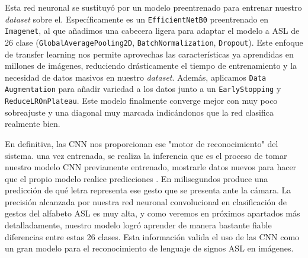 Esta red neuronal se sustituyó por un modelo preentrenado para entrenar nuestro \textit{dataset} sobre el. Específicamente es un \texttt{EfficientNetB0} preentrenado en \texttt{Imagenet}, al que añadimos una cabecera ligera para adaptar el modelo a ASL de 26 clase (\texttt{GlobalAveragePooling2D}, \texttt{BatchNormalization}, \texttt{Dropout}). Este enfoque de transfer learning nos permite aprovechas las características ya aprendidas en millones de imágenes, reduciendo drásticamente el tiempo de entrenamiento y la necesidad de datos masivos en nuestro \textit{dataset}.
Además, aplicamos \texttt{Data Augmentation} para añadir variedad a los datos junto a un \texttt{EarlyStopping} y \texttt{ReduceLROnPlateau}. Este modelo finalmente converge mejor con muy poco sobreajuste y una diagonal muy marcada indicándonos que la red clasifica realmente bien. 

En definitiva, las CNN nos proporcionan ese "motor de reconocimiento" del sistema. una vez entrenada, se realiza la inferencia que es el proceso de tomar nuestro modelo CNN previamente entrenado, mostrarle datos nuevos para hacer que el propio modelo realice predicciones \cite{web:inferencia_oracle}. En milisegundos produce una predicción de qué letra representa ese gesto que se presenta ante la cámara. La precisión alcanzada por nuestra red neuronal convolucional en clasificación de gestos del alfabeto ASL es muy alta, y como veremos en próximos apartados más detalladamente, nuestro modelo logró aprender de manera bastante fiable diferencias entre estas 26 clases. Esta información valida el uso de las CNN como un gran modelo para el reconocimiento de lenguaje de signos ASL en imágenes.





